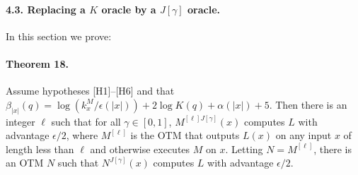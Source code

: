 \documentclass[10pt,a4paper]{article}
\begin{document}
\paragraph{4.3. Replacing a $K$ oracle by a $J[\gamma]$ oracle.}
In this section we prove:
\paragraph{Theorem 18.}
Assume hypotheses [H1]--[H6] and that $\beta_{|x|}(q)=\log(k_x^M/\epsilon(|x|))+2\log K(q)+\alpha(|x|)+5$. Then there is an integer $\ell$ such that for all $\gamma\in[0,1]$, $M^{[\ell]J[\gamma]}(x)$ computes $L$ with advantage $\epsilon/2$, where $M^{[\ell]}$ is the OTM that outputs $L(x)$ on any input $x$ of length less than $\ell$ and otherwise executes $M$ on $x$. Letting $N=M^{[\ell]}$, there is an OTM $N$ such that $N^{J[\gamma]}(x)$ computes $L$ with advantage $\epsilon/2$.
\end{document}
